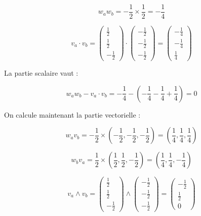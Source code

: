 \documentclass[a4paper,12pt]{article}
\begin{document}
\begin{enumerate}
            \[ w_a w_b = -\frac{1}{2} \times \frac{1}{2} = -\frac{1}{4} \]

            \[ 
              v_a \cdot v_b =
              \begin{pmatrix} \frac{1}{2} \\ \frac{1}{2} \\ -\frac{1}{2} \end{pmatrix} \cdot
              \begin{pmatrix} -\frac{1}{2} \\ -\frac{1}{2} \\ -\frac{1}{2} \end{pmatrix} =
              \begin{pmatrix} -\frac{1}{4} \\ -\frac{1}{4} \\ \frac{1}{4} \end{pmatrix}
            \]

            La partie scalaire vaut :

            \[ 
              w_a w_b - v_a \cdot v_b =
              -\frac{1}{4} - \left( -\frac{1}{4} -\frac{1}{4} + \frac{1}{4} \right) 
              = 0
            \]

            \newpage On calcule maintenant la partie vectorielle :

            \[ 
              w_a v_b = -\frac{1}{2} \times \left( -\frac{1}{2}, -\frac{1}{2}, -\frac{1}{2} \right) 
              = \left( \frac{1}{4}, \frac{1}{4}, \frac{1}{4} \right) 
            \]

            \[ 
              w_b v_a = \frac{1}{2} \times \left( \frac{1}{2}, \frac{1}{2}, -\frac{1}{2} \right) 
              = \left( \frac{1}{4}, \frac{1}{4}, -\frac{1}{4} \right) 
            \]

            \[
              v_a \wedge v_b = 
              \begin{pmatrix} \frac{1}{2} \\ \frac{1}{2} \\ -\frac{1}{2} \end{pmatrix} 
              \wedge 
              \begin{pmatrix} -\frac{1}{2} \\ -\frac{1}{2} \\ -\frac{1}{2} \end{pmatrix} 
              = 
              \begin{pmatrix} -\frac{1}{2} \\ \frac{1}{2} \\ 0 \end{pmatrix}
            \]


\end{enumerate}
\end{document}
